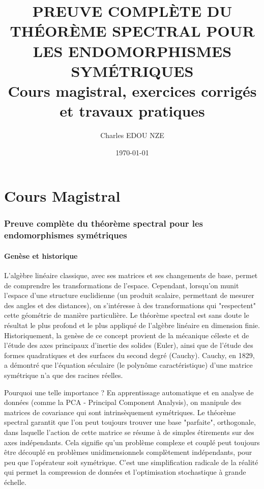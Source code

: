 \documentclass[11pt,a4paper]{article}
\title{\Huge PREUVE COMPLÈTE DU THÉORÈME SPECTRAL POUR LES ENDOMORPHISMES SYMÉTRIQUES \\ \large Cours magistral, exercices corrigés et travaux pratiques}
\author{\Large Charles EDOU NZE}
\date{\today}
\begin{document}
\maketitle
\tableofcontents
\newpage

\part{Cours Magistral}

\section{Preuve complète du théorème spectral pour les endomorphismes symétriques}

\subsection{Genèse et historique}

L'algèbre linéaire classique, avec ses matrices et ses changements de base, permet de comprendre les transformations de l'espace. Cependant, lorsqu'on munit l'espace d'une structure euclidienne (un produit scalaire, permettant de mesurer des angles et des distances), on s'intéresse à des transformations qui "respectent" cette géométrie de manière particulière.
Le théorème spectral est sans doute le résultat le plus profond et le plus appliqué de l'algèbre linéaire en dimension finie. Historiquement, la genèse de ce concept provient de la mécanique céleste et de l'étude des axes principaux d'inertie des solides (Euler), ainsi que de l'étude des formes quadratiques et des surfaces du second degré (Cauchy). Cauchy, en 1829, a démontré que l'équation séculaire (le polynôme caractéristique) d'une matrice symétrique n'a que des racines réelles.

Pourquoi une telle importance ? En apprentissage automatique et en analyse de données (comme la PCA - Principal Component Analysis), on manipule des matrices de covariance qui sont intrinsèquement symétriques. Le théorème spectral garantit que l'on peut toujours trouver une base "parfaite", orthogonale, dans laquelle l'action de cette matrice se résume à de simples étirements sur des axes indépendants. Cela signifie qu'un problème complexe et couplé peut toujours être découplé en problèmes unidimensionnels complètement indépendants, pour peu que l'opérateur soit symétrique. C'est une simplification radicale de la réalité qui permet la compression de données et l'optimisation stochastique à grande échelle.
\end{document}
